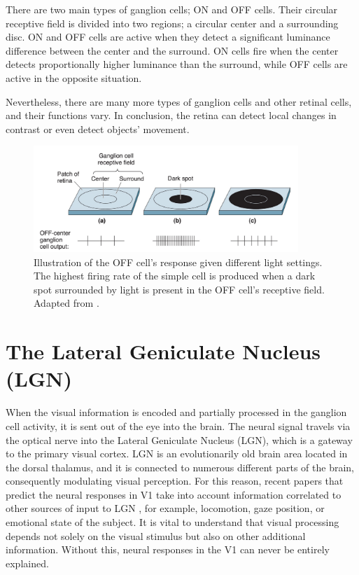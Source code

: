 There are two main types of ganglion cells; ON and OFF cells. Their circular receptive field is divided into two regions; a circular center and a surrounding disc. ON and OFF cells are active when they detect a significant luminance difference between the center and the surround. ON cells fire when the center detects proportionally higher luminance than the surround, while OFF cells are active in the opposite situation.

Nevertheless, there are many more types of ganglion cells and other retinal cells, and their functions vary. In conclusion, the retina can detect local changes in contrast or even detect objects’ movement. 

\begin{figure}[H]\centering
	\includegraphics[width=100mm]{../img/on_off_cell.png}
	\caption{Illustration of the OFF cell’s response given different light settings. The highest firing rate of the simple cell is produced when a dark spot surrounded by light is present in the OFF cell’s receptive field. Adapted from \citep{bear2020neuroscience}.}
	\label{img_on_off_cell}
\end{figure}

\section{The Lateral Geniculate Nucleus (LGN)}

When the visual information is encoded and partially processed in the ganglion cell activity, it is sent out of the eye into the brain. The neural signal travels via the optical nerve into the Lateral Geniculate Nucleus (LGN), which is a gateway to the primary visual cortex. LGN is an evolutionarily old brain area located in the dorsal thalamus, and it is connected to numerous different parts of the brain, consequently modulating visual perception. For this reason, recent papers that predict the neural responses in V1 take into account information correlated to other sources of input to LGN \citep{sinz2018stimulus}, for example, locomotion, gaze position, or emotional state of the subject. It is vital to understand that visual processing depends not solely on the visual stimulus but also on other additional information. Without this, neural responses in the V1 can never be entirely explained. 

